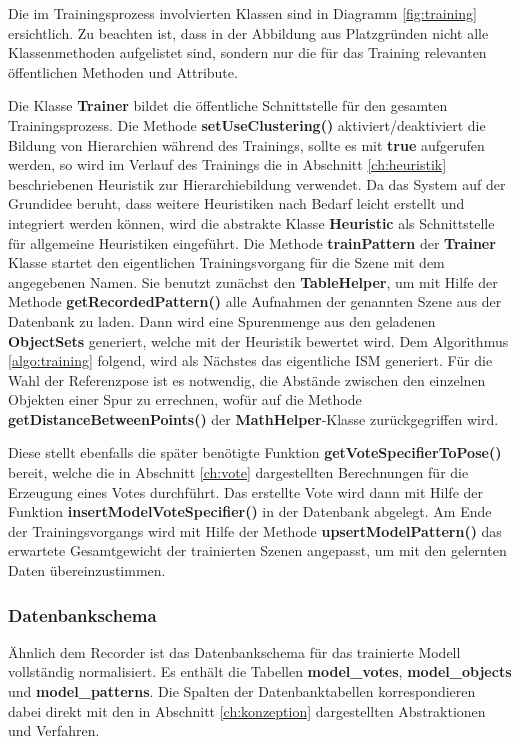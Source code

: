 Die im Trainingsprozess involvierten Klassen sind in Diagramm \vref{fig:training} ersichtlich.
Zu beachten ist, dass in der Abbildung aus Platzgründen nicht alle Klassenmethoden aufgelistet sind, sondern nur die für das Training relevanten öffentlichen Methoden und Attribute.

Die Klasse \textbf{Trainer} bildet die öffentliche Schnittstelle für den gesamten Trainingsprozess.
Die Methode \textbf{setUseClustering()} aktiviert/deaktiviert die Bildung von Hierarchien während des Trainings, sollte es mit \textbf{true} aufgerufen werden, so wird im Verlauf des Trainings die in Abschnitt \vref{ch:heuristik} beschriebenen Heuristik zur Hierarchiebildung verwendet.
Da das System auf der Grundidee beruht, dass weitere Heuristiken nach Bedarf leicht erstellt und integriert werden können, wird die abstrakte Klasse \textbf{Heuristic} als Schnittstelle für allgemeine Heuristiken eingeführt.
Die Methode \textbf{trainPattern} der \textbf{Trainer} Klasse startet den eigentlichen Trainingsvorgang für die Szene mit dem angegebenen Namen.
Sie benutzt zunächst den \textbf{TableHelper}, um mit Hilfe der Methode \textbf{getRecordedPattern()} alle Aufnahmen der genannten Szene aus der Datenbank zu laden.
Dann wird eine Spurenmenge aus den geladenen \textbf{ObjectSets} generiert, welche mit der Heuristik bewertet wird.
Dem Algorithmus \vref{algo:training} folgend, wird als Nächstes das eigentliche ISM generiert.
Für die Wahl der Referenzpose ist es notwendig, die Abstände zwischen den einzelnen Objekten einer Spur zu errechnen, wofür auf die Methode \textbf{getDistanceBetweenPoints()} der \textbf{MathHelper}-Klasse zurückgegriffen wird.

Diese stellt ebenfalls die später benötigte Funktion \textbf{getVoteSpecifierToPose()} bereit, welche die in Abschnitt \vref{ch:vote} dargestellten Berechnungen für die Erzeugung eines Votes durchführt.
Das erstellte Vote wird dann mit Hilfe der Funktion \textbf{insertModelVoteSpecifier()} in der Datenbank abgelegt.
Am Ende der Trainingsvorgangs wird mit Hilfe der Methode \textbf{upsertModelPattern()} das erwartete Gesamtgewicht der trainierten Szenen angepasst, um mit den gelernten Daten übereinzustimmen.

\subsubsection{Datenbankschema}

Ähnlich dem Recorder ist das Datenbankschema für das trainierte Modell vollständig normalisiert.
Es enthält die Tabellen \textbf{model\_votes}, \textbf{model\_objects} und \textbf{model\_patterns}.
Die Spalten der Datenbanktabellen korrespondieren dabei direkt mit den in Abschnitt \vref{ch:konzeption} dargestellten Abstraktionen und Verfahren.

